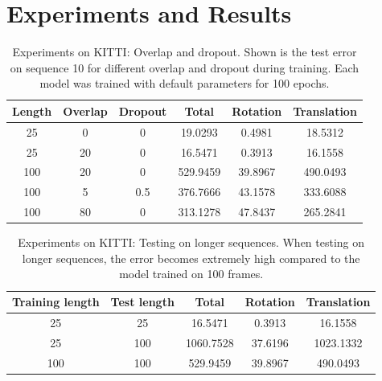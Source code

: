 			
	\section{Experiments and Results}\label{sec:odometry-experiments-and-results}
	
		\begin{table}[tb]
			\small
			\begin{center}
				\begin{tabular}{|c|c|c||c|c|c|}
					\hline
					Length 	& Overlap 	& Dropout	& Total 	& Rotation	& Translation	\\ \hline
					25		& 0			& 0			& 19.0293	& 0.4981	& 18.5312		\\ \hline
					25		& 20		& 0			& 16.5471	& 0.3913	& 16.1558		\\ \hline
					100		& 20		& 0			& 529.9459	& 39.8967	& 490.0493		\\ \hline
					100 	& 5			& 0.5		& 376.7666	& 43.1578	& 333.6088		\\ \hline
					100		& 80		& 0			& 313.1278	& 47.8437	& 265.2841		\\ \hline
				\end{tabular}
			\end{center}
			\caption[Experiments on KITTI: Overlap and dropout]
					{Experiments on KITTI: Overlap and dropout. 
					 Shown is the test error on sequence 10 for different overlap and dropout during training.
					 Each model was trained with default parameters for 100 epochs.
					 \label{tbl:kitti-overlap-and-dropout}}
		\end{table}
		
		\begin{table}[tb]
			\small
			\begin{center}
				\begin{tabular}{|c|c||c|c|c|}
					\hline
					Training length & Test length 	& Total 	& Rotation	& Translation	\\ \hline
					25				& 25			& 16.5471	& 0.3913	& 16.1558		\\ \hline
					25				& 100			& 1060.7528	& 37.6196	& 1023.1332		\\ \hline
					100				& 100			& 529.9459	& 39.8967	& 490.0493		\\ \hline
				\end{tabular}
			\end{center}
			\caption[Experiments on KITTI: Testing on longer sequences]
					{Experiments on KITTI: Testing on longer sequences. 
					 When testing on longer sequences, the error becomes extremely high compared to the model trained on 100 frames.
					 \label{tbl:kitti-testing-on-longer-sequences}}
		\end{table}
	
